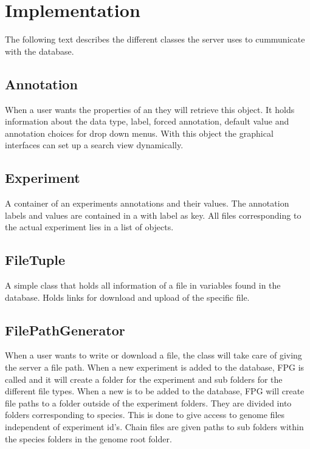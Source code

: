 \section{Implementation}
The following text describes the different classes the server uses to cummunicate with the database.
\subsection{Annotation}
When a user wants the properties of an  they will retrieve this object. It holds information about the data type, label, forced annotation, default value and annotation choices for drop down menus. With this object the graphical interfaces can set up a search view dynamically.

\subsection{Experiment}
A container of an experiments annotations and their values. The annotation labels and values are contained in a  with label as key. All files corresponding to the actual experiment lies in a list of  objects.

\subsection{FileTuple}
A simple class that holds all information of a file in variables found in the database. Holds links for download and upload of the specific file.

\subsection{FilePathGenerator}
When a user wants to write or download a file, the  class will take care of giving the server a file path. When a new experiment is added to the database, FPG is called and it will create a folder for the experiment and sub folders for the different file types. When a new  is to be added to the database, FPG will create file paths to a folder outside of the experiment folders. They are divided into folders corresponding to species.  This is done to give access to genome files independent of experiment id's. Chain files are given paths to sub folders within the species folders in the genome root folder.


